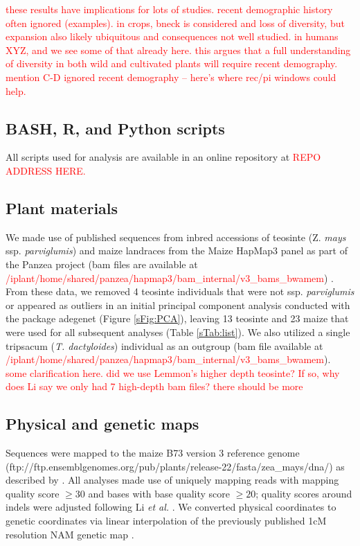 \documentclass{pnastwo}
\newcommand{\jri}[1]{\textcolor{red}{\scriptsize #1}}
\begin{document}
\begin{article}
\jri{these results have implications for lots of studies. recent demographic history often ignored (examples). in crops, bneck is considered and loss of diversity, but expansion also likely ubiquitous and consequences not well studied.  in humans XYZ, and we see some of that already here. this argues that a full understanding of diversity in both wild and cultivated plants will require recent demography. mention C-D ignored recent demography -- here's where rec/pi windows could help.}

\begin{materials}

\subsection{BASH, R, and Python scripts}
All scripts used for analysis are available in an online repository at \textcolor{red}{REPO ADDRESS HERE.} 

\subsection{Plant materials}
We made use of published sequences from inbred accessions of teosinte (Z. \emph{mays} ssp. \emph{parviglumis}) and maize landraces from the Maize HapMap3 panel as part of the Panzea project (bam files are available at \textcolor{red}{/iplant/home/shared/panzea/hapmap3/bam\_internal/v3\_bams\_bwamem}) \cite{chia2012, lemmon2014,hapmap3}. 
From these data, we removed 4 teosinte individuals that were not ssp. \emph{parviglumis} or appeared as outliers in an initial principal component analysis conducted with the package adegenet \cite{jombart2011} (Figure \ref{sFig:PCA}), leaving 13 teosinte and 23 maize that were used for all subsequent analyses (Table \ref{sTab:list}). We also utilized a single tripsacum (\emph{T. dactyloides}) individual as an outgroup (bam file available at \textcolor{red}{/iplant/home/shared/panzea/hapmap3/bam\_internal/v3\_bams\_bwamem}). \jri{some clarification here. did we use Lemmon's higher depth teosinte? If so, why does Li say we only had 7 high-depth bam files? there should be more}

\subsection{Physical and genetic maps}
Sequences were mapped to the maize B73 version 3 reference genome \cite{schnable2009} (ftp://ftp.ensemblgenomes.org/pub/plants/release-22/fasta/zea\_mays/dna/) as described by \cite{hapmap3}. All analyses made use of uniquely mapping reads with mapping quality score $\geq  30$ and bases with base quality score $\geq 20$; quality scores around indels were adjusted following Li \emph{et al.} \cite{li2011statistical}.
We converted physical coordinates to genetic coordinates via linear interpolation of the previously published 1cM resolution NAM genetic map \cite{glaubitz2014}. 


\end{materials}
\end{article}
\end{document}
